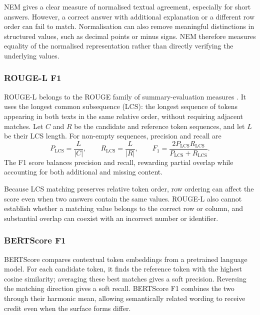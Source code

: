 NEM gives a clear measure of normalised textual agreement, especially for short answers. However, a correct
answer with additional explanation or a different row order can fail to match. Normalisation can also remove
meaningful distinctions in structured values, such as decimal points or minus signs. NEM therefore measures
equality of the normalised representation rather than directly verifying the underlying values.

\subsubsection{ROUGE-L F1}

ROUGE-L belongs to the ROUGE family of summary-evaluation measures \cite{lin2004rouge}. It uses the longest
common subsequence (LCS): the longest sequence of tokens appearing in both texts in the same relative order,
without requiring adjacent matches. Let $C$ and $R$ be the candidate and reference token sequences, and let
$L$ be their LCS length. For non-empty sequences, precision and recall are
\begin{equation}   P_{\mathrm{LCS}} = \frac{L}{|C|}, \qquad   R_{\mathrm{LCS}} = \frac{L}{|R|}, \qquad   F_1
  = \frac{\num{2}P_{\mathrm{LCS}}R_{\mathrm{LCS}}}{P_{\mathrm{LCS}}+R_{\mathrm{LCS}}}.
\end{equation} The F1 score balances precision and recall, rewarding partial overlap while accounting for
both additional and missing content.

Because LCS matching preserves relative token order, row ordering can affect the score even when two answers
contain the same values. ROUGE-L also cannot establish whether a matching value belongs to the correct row or
column, and substantial overlap can coexist with an incorrect number or identifier.

\subsubsection{BERTScore F1}

BERTScore \cite{zhang2019bertscore} compares contextual token embeddings from a pretrained language model.
For each candidate token, it finds the reference token with the highest cosine similarity; averaging these
best matches gives a soft precision. Reversing the matching direction gives a soft recall. BERTScore F1
combines the two through their harmonic mean, allowing semantically related wording to receive credit even
when the surface forms differ.

